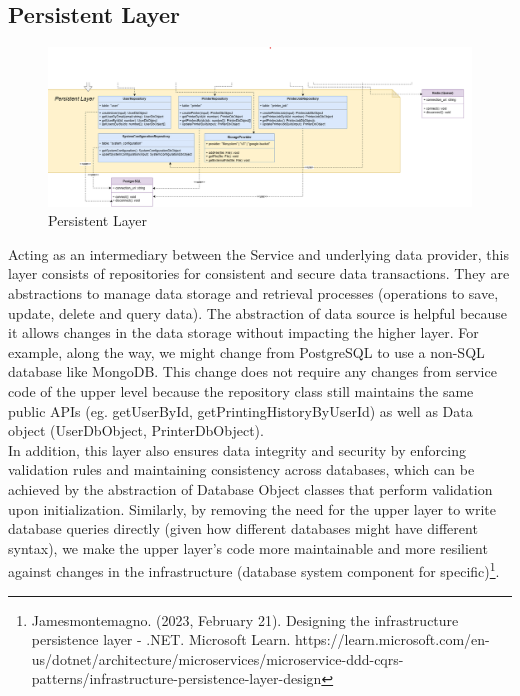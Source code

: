 \subsection{Persistent Layer}

\begin{figure}[H]
  \includegraphics[max width=0.9\linewidth]{chapters/6. architecture-design/Layered Architecture/4. Persistent Layer.png}
  \caption{Persistent Layer}%
\end{figure}

Acting as an intermediary between the Service and underlying data provider, this layer consists of repositories for consistent and secure data transactions. They are abstractions to manage data storage and retrieval processes (operations to save, update, delete and query data). The abstraction of data source is helpful because it allows changes in the data storage without impacting the higher layer. For example, along the way, we might change from PostgreSQL to use a non-SQL database like MongoDB. This change does not require any changes from service code of the upper level because the repository class still maintains the same public APIs (eg. getUserById, getPrintingHistoryByUserId) as well as Data object (UserDbObject, PrinterDbObject). \\

In addition, this layer also ensures data integrity and security by enforcing validation rules and maintaining consistency across databases, which can be achieved by the abstraction of Database Object classes that perform validation upon initialization. Similarly, by removing the need for the upper layer to write database queries directly (given how different databases might have different syntax), we make the upper layer’s code more maintainable and more resilient against changes in the infrastructure (database system component for specific)\footnote{Jamesmontemagno. (2023, February 21). Designing the infrastructure persistence layer - .NET. Microsoft Learn. https://learn.microsoft.com/en-us/dotnet/architecture/microservices/microservice-ddd-cqrs-patterns/infrastructure-persistence-layer-design
}.\\

